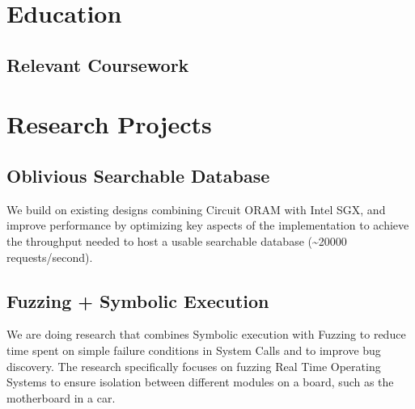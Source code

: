 \documentclass[11pt,letterpaper,sans]{moderncv}        %
\begin{document}
\makecvtitle
\vspace{-3em}

\section{Education}
\subsection{Relevant Coursework}

\section{Research Projects}
\subsection{\textbf{Oblivious Searchable Database}}
We build on existing designs combining Circuit ORAM with Intel SGX, and improve performance by optimizing key aspects of the implementation to achieve the throughput
needed to host a usable searchable database (\textasciitilde 20000 requests/second).

\subsection{\textbf{Fuzzing + Symbolic Execution}}
We are doing research that combines Symbolic execution with Fuzzing to reduce time spent on simple failure conditions in System Calls and to improve bug discovery.
The research specifically focuses on fuzzing Real Time Operating Systems to ensure isolation between different modules on a board, such as the motherboard
in a car.
\end{document}
